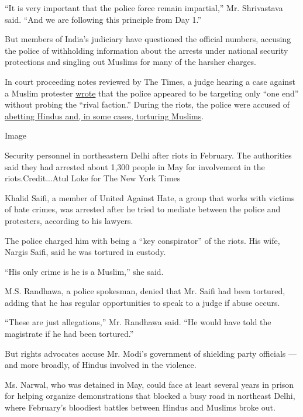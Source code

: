 ``It is very important that the police force remain impartial,'' Mr.
Shrivastava said. ``And we are following this principle from Day 1.''

But members of India's judiciary have questioned the official numbers,
accusing the police of withholding information about the arrests under
national security protections and singling out Muslims for many of the
harsher charges.

In court proceeding notes reviewed by The Times, a judge hearing a case
against a Muslim protester
\href{https://www.outlookindia.com/newsscroll/delhi-violence-investigation-in-case-seems-to-be-targeted-towards-one-end-says-court/1848821}{wrote}
that the police appeared to be targeting only ``one end'' without
probing the ``rival faction.'' During the riots, the police were accused
of
\href{https://www.nytimes.com/2020/03/12/world/asia/india-police-muslims.html}{abetting
Hindus and, in some cases, torturing Muslims}.

Image

Security personnel in northeastern Delhi after riots in February. The
authorities said they had arrested about 1,300 people in May for
involvement in the riots.Credit...Atul Loke for The New York Times

Khalid Saifi, a member of United Against Hate, a group that works with
victims of hate crimes, was arrested after he tried to mediate between
the police and protesters, according to his lawyers.

The police charged him with being a ``key conspirator'' of the riots.
His wife, Nargis Saifi, said he was tortured in custody.

``His only crime is he is a Muslim,'' she said.

M.S. Randhawa, a police spokesman, denied that Mr. Saifi had been
tortured, adding that he has regular opportunities to speak to a judge
if abuse occurs.

``These are just allegations,'' Mr. Randhawa said. ``He would have told
the magistrate if he had been tortured.''

But rights advocates accuse Mr. Modi's government of shielding party
officials --- and more broadly, of Hindus involved in the violence.

Ms. Narwal, who was detained in May, could face at least several years
in prison for helping organize demonstrations that blocked a busy road
in northeast Delhi, where February's bloodiest battles between Hindus
and Muslims broke out.

